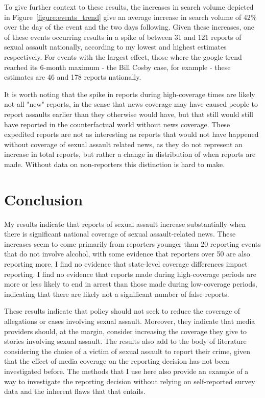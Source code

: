 \documentclass[AER,draftmode]{AEA}
\begin{document}
To give further context to these results, the increases in search volume depicted in Figure~\ref{figure:events_trend} give an average increase in search volume of 42\% over the day of the event and the two days following. Given these increases, one of these events occurring results in a spike of between 31 and 121 reports of sexual assault nationally, according to my lowest and highest estimates respectively. For events with the largest effect, those where the google trend reached its 6-month maximum - the Bill Cosby case, for example - these estimates are 46 and 178 reports nationally. 

It is worth noting that the spike in reports during high-coverage times are likely not all "new" reports, in the sense that news coverage may have caused people to report assaults earlier than they otherwise would have, but that still would still have reported in the counterfactual world without news coverage. These expedited reports are not as interesting as reports that would not have happened without coverage of sexual assault related news, as they do not represent an increase in total reports, but rather a change in distribution of when reports are made. Without data on non-reporters this distinction is hard to make. 

\section{Conclusion}

My results indicate that reports of sexual assault increase substantially when there is significant national coverage of sexual assault-related news. These increases seem to come primarily from reporters younger than 20 reporting events that do not involve alcohol, with some evidence that reporters over 50 are also reporting more. I find no evidence that state-level coverage differences impact reporting. I find no evidence that reports made during high-coverage periods are more or less likely to end in arrest than those made during low-coverage periods, indicating that there are likely not a significant number of false reports.

These results indicate that policy should not seek to reduce the coverage of allegations or cases involving sexual assault. Moreover, they indicate that media providers should, at the margin, consider increasing the coverage they give to stories involving sexual assault. The results also add to the body of literature considering the choice of a victim of sexual assault to report their crime, given that the effect of media coverage on the reporting decision has not been investigated before. The methods that I use here also provide an example of a way to investigate the reporting decision without relying on self-reported survey data and the inherent flaws that that entails.
\end{document}
